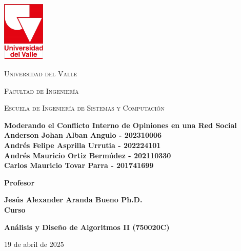 \documentclass[11pt,letter]{article}
\begin{document}
    \onehalfspacing

    \begin{titlepage}
        \centering
        \includegraphics[width=0.15\textwidth]{resources/universidad-del-valle.png}\par\vspace{1cm}
        {\scshape\LARGE Universidad del Valle \par}
        {\scshape\Large Facultad de Ingeniería \par}
        {\scshape\Large Escuela de Ingeniería de Sistemas y Computación \par}
        \vspace{2cm}

        {\Large \textbf{Moderando el Conflicto Interno de Opiniones en una Red Social}}\\

        \vspace{2cm}
        {\large \textbf{Anderson Johan Alban Angulo - 202310006}}\\
        {\large \textbf{Andrés Felipe Asprilla Urrutia - 202224101 }}\\
        {\large \textbf{Andrés Mauricio Ortiz Bermúdez - 202110330}}\\
        {\large \textbf{Carlos Mauricio Tovar Parra - 201741699}}\\
        \vspace{2cm}

        \Large\textbf{Profesor}\par
        {\large \textbf{Jesús Alexander Aranda Bueno Ph.D.}}\\
        \vspace{1.4cm}
        \Large\textbf{Curso}\par
        {\large \textbf{Análisis y Diseño de Algoritmos II (750020C)}}\\
        \vspace{1cm}
        {\large {19 de abril de 2025}\par}
    \end{titlepage}

    \tableofcontents
    \newpage
\end{document}

